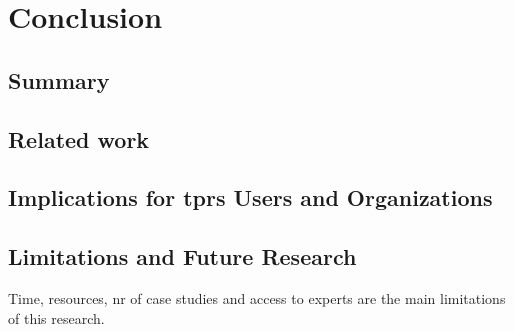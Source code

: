 
\newpage
\section{Conclusion}


\subsection{Summary}


\subsection{Related work}


\subsection{Implications for \ac{tprs} Users and Organizations}


\subsection{Limitations and Future Research}

Time, resources, nr of case studies and access to experts are the main limitations of this research.
